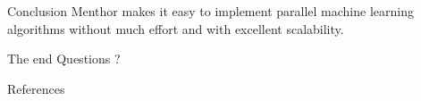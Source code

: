 \documentclass{beamer}
\begin{document}

\begin{frame}{Conclusion}
Menthor makes it easy to implement parallel machine learning algorithms without much effort and with excellent scalability.
\end{frame}


\begin{frame}{The end}
Questions ?
\end{frame}

\begin{frame}[allowframebreaks]{References}


\end{frame}
\end{document}
